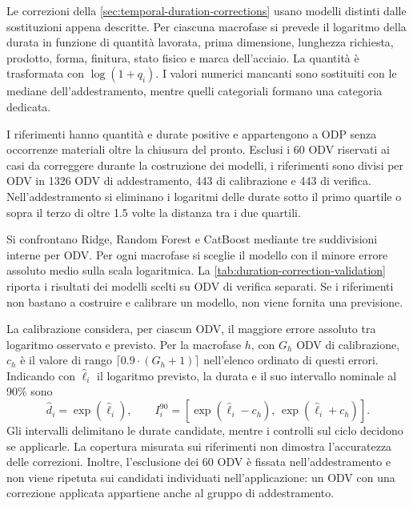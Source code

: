 Le correzioni della \cref{sec:temporal-duration-corrections} usano modelli distinti dalle sostituzioni appena descritte. Per ciascuna macrofase si prevede il logaritmo della durata in funzione di quantità lavorata, prima dimensione, lunghezza richiesta, prodotto, forma, finitura, stato fisico e marca dell'acciaio. La quantità è trasformata con \mbox{$\log(1+q_i)$}. I valori numerici mancanti sono sostituiti con le mediane dell'addestramento, mentre quelli categoriali formano una categoria dedicata.

I riferimenti hanno quantità e durate positive e appartengono a ODP senza occorrenze materiali oltre la chiusura del pronto. Esclusi i 60 ODV riservati ai casi da correggere durante la costruzione dei modelli, i riferimenti sono divisi per ODV in \num{1326} ODV di addestramento, 443 di calibrazione e 443 di verifica. Nell'addestramento si eliminano i logaritmi delle durate sotto il primo quartile o sopra il terzo di oltre \num{1.5} volte la distanza tra i due quartili.

Si confrontano Ridge, Random Forest e CatBoost \parencite{prokhorenkova2018catboost} mediante tre suddivisioni interne per ODV. Per ogni macrofase si sceglie il modello con il minore errore assoluto medio sulla scala logaritmica. La \cref{tab:duration-correction-validation} riporta i risultati dei modelli scelti su ODV di verifica separati. Se i riferimenti non bastano a costruire e calibrare un modello, non viene fornita una previsione.



La calibrazione considera, per ciascun ODV, il maggiore errore assoluto tra logaritmo osservato e previsto. Per la macrofase $h$, con $G_h$ ODV di calibrazione, $c_h$ è il valore di rango $\lceil0.9\cdot(G_h+1)\rceil$ nell'elenco ordinato di questi errori. Indicando con $\widehat{\ell}_i$ il logaritmo previsto, la durata e il suo intervallo nominale al 90\% sono
\begin{equation}
\label{eq:duration-correction-interval}
\widehat{d}_i=\exp(\widehat{\ell}_i),
\qquad
I_i^{90}=\left[\exp(\widehat{\ell}_i-c_h),\,\exp(\widehat{\ell}_i+c_h)\right].
\end{equation}
Gli intervalli delimitano le durate candidate, mentre i controlli sul ciclo decidono se applicarle. La copertura misurata sui riferimenti non dimostra l'accuratezza delle correzioni. Inoltre, l'esclusione dei 60 ODV è fissata nell'addestramento e non viene ripetuta sui candidati individuati nell'applicazione: un ODV con una correzione applicata appartiene anche al gruppo di addestramento.

